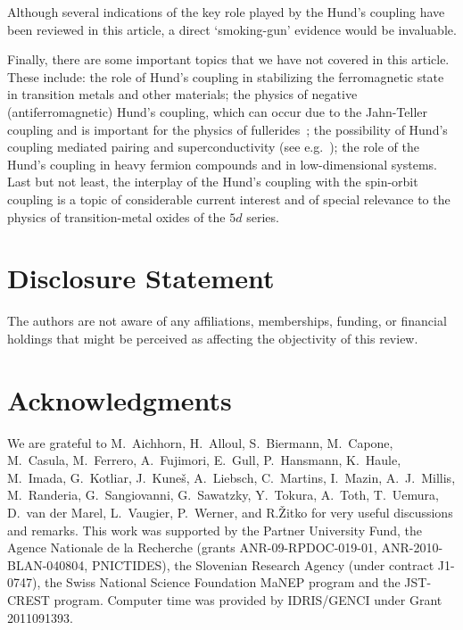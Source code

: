 \documentclass[]{ar2e-changed}%
\begin{document}
Although several indications of the key role played by the Hund's coupling have been reviewed in this article, 
a direct `smoking-gun' evidence would be invaluable. 

%
Finally, there are some  important topics that we have not covered in this article. 
These include: 
the role of Hund's coupling in stabilizing the ferromagnetic state~\cite{vanvleck_rmp_1953} in transition metals and other materials;  
the physics of negative (antiferromagnetic) Hund's coupling, which can occur due to the Jahn-Teller 
coupling and is important for the physics of fullerides~\cite{capone_rmp_fullerides_2009}; 
the possibility of Hund's coupling mediated pairing and superconductivity (see e.g.~\cite{norman_1994,han_2004}); 
the role of the Hund's coupling in heavy fermion compounds and in low-dimensional systems.  
%
Last but not least, the interplay of the Hund's coupling with the spin-orbit coupling is a topic of considerable current 
interest and of special relevance to the physics of transition-metal oxides of the $5d$ series. 


\section*{Disclosure Statement}

The authors are not aware of any affiliations, memberships, funding, or financial holdings that might be perceived as affecting the objectivity of this review.

\section*{Acknowledgments}
We  are grateful to M.~Aichhorn, H.~Alloul, S.~Biermann, M.~Capone, M.~Casula, M.~Ferrero, A.~Fujimori, E.~Gull, P.~Hansmann, K.~Haule,
M.~Imada, G.~Kotliar, J.~Kune\v{s}, A.~Liebsch, C.~Martins, I.~Mazin, A.~J.~Millis, M.~Randeria, G.~Sangiovanni, 
G.~Sawatzky, Y.~Tokura, A.~Toth, T.~Uemura,
D.~van der Marel, L.~Vaugier, P.~Werner,  and R.\v{Z}itko for very useful discussions and remarks. 
This work was supported by the Partner University Fund, the Agence Nationale de 
la Recherche (grants ANR-09-RPDOC-019-01, ANR-2010-BLAN-040804, PNICTIDES), 
the Slovenian Research Agency (under contract J1-0747), the 
Swiss National Science Foundation MaNEP program and the JST-CREST program.  
Computer time was provided by IDRIS/GENCI under Grant 2011091393. 
\end{document}
